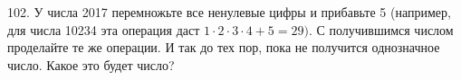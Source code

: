 102. У числа 2017 перемножьте все ненулевые цифры и прибавьте 5 (например, для числа 10234 эта операция даст $1\cdot2\cdot3\cdot4+5=29).$ С получившимся числом проделайте те же операции. И так до тех пор, пока не получится однозначное число. Какое это будет число?\\
